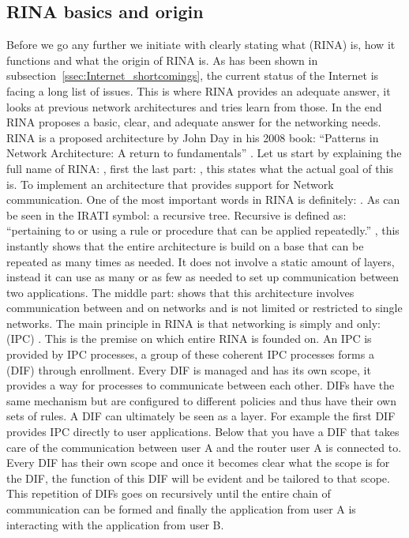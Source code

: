 \subsection{RINA basics and origin}
\label{ssec:RINAbasics}
Before we go any further we initiate with clearly stating what  (RINA) is, how it functions and what the origin of RINA is. As has been shown in subsection~\ref{ssec:Internet_shortcomings}, the current status of the Internet is facing a long list of issues. This is where RINA provides an adequate answer, it looks at previous network architectures and tries learn from those. In the end RINA proposes a basic, clear, and adequate answer for the networking needs.
\npar
RINA is a proposed architecture by John Day in his 2008 book: ``Patterns in Network Architecture: A return to fundamentals'' \citep{johnday2008}. 
Let us start by explaining the full name of RINA: , first the last part: , this states what the actual goal of this is. To implement an architecture that provides support for Network communication. One of the most important words in RINA is definitely: . As can be seen in the IRATI symbol: a recursive tree. Recursive is defined as: ``pertaining to or using a rule or procedure that can be applied repeatedly.'' \citep{website:recursive_definition}, 
this instantly shows that the entire architecture is build on a base that can be repeated as many times as needed. It does not involve a static amount of layers, instead it can use as many or as few as needed to set up communication between two applications. The middle part:  shows that this architecture involves communication between and on networks and is not limited or restricted to single networks.
\npar
The main principle in RINA is that networking is simply and only:  (IPC) \citep{johnday2008}. This is the premise on which entire RINA is founded on. An IPC is provided by IPC processes, a group of these coherent IPC processes forms a  (DIF) through enrollment. Every DIF is managed and has its own scope, it provides a way for processes to communicate between each other. DIFs have the same mechanism but are configured to different policies and thus have their own sets of rules. A DIF can ultimately be seen as a layer. For example the first DIF provides IPC directly to user applications. Below that you have a DIF that takes care of the communication between user A and the router user A is connected to. Every DIF has their own scope and once it becomes clear what the scope is for the DIF, the function of this DIF will be evident and be tailored to that scope. This repetition of DIFs goes on recursively until the entire chain of communication can be formed and finally the application from user A is interacting with the application from user B.
